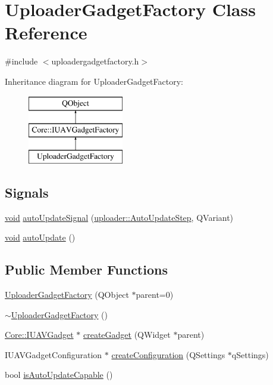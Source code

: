 \hypertarget{class_uploader_gadget_factory}{\section{Uploader\-Gadget\-Factory Class Reference}
\label{class_uploader_gadget_factory}
}


{\ttfamily \#include $<$uploadergadgetfactory.\-h$>$}

Inheritance diagram for Uploader\-Gadget\-Factory\-:\begin{figure}[H]
\begin{center}
\leavevmode
\includegraphics[height=3.000000cm]{class_uploader_gadget_factory}
\end{center}
\end{figure}
\subsection*{Signals}
\begin{DoxyCompactItemize}
\item 
\hyperlink{group___u_a_v_objects_plugin_ga444cf2ff3f0ecbe028adce838d373f5c}{void} \hyperlink{group___y_modem_uploader_ga1db019129aec5db54cea977a3628092e}{auto\-Update\-Signal} (\hyperlink{namespaceuploader_adb90c08cc33a348c2363c1d7a9626422}{uploader\-::\-Auto\-Update\-Step}, Q\-Variant)
\item 
\hyperlink{group___u_a_v_objects_plugin_ga444cf2ff3f0ecbe028adce838d373f5c}{void} \hyperlink{group___y_modem_uploader_gaf1635d4877cd9ffd1933c45884278845}{auto\-Update} ()
\end{DoxyCompactItemize}
\subsection*{Public Member Functions}
\begin{DoxyCompactItemize}
\item 
\hyperlink{group___y_modem_uploader_ga33e544ad20fa638bbf34e7a461d3306e}{Uploader\-Gadget\-Factory} (Q\-Object $\ast$parent=0)
\item 
\hyperlink{group___y_modem_uploader_ga7509287bf0bfbf3b364591ac90155886}{$\sim$\-Uploader\-Gadget\-Factory} ()
\item 
\hyperlink{class_core_1_1_i_u_a_v_gadget}{Core\-::\-I\-U\-A\-V\-Gadget} $\ast$ \hyperlink{group___y_modem_uploader_gaec0b67dc3c2b6c12df29c01be93457fb}{create\-Gadget} (Q\-Widget $\ast$parent)
\item 
I\-U\-A\-V\-Gadget\-Configuration $\ast$ \hyperlink{group___y_modem_uploader_gada950b4297da08d576452a67d7c42f59}{create\-Configuration} (Q\-Settings $\ast$q\-Settings)
\item 
bool \hyperlink{group___y_modem_uploader_ga1c32bfa644ec01ae5f98410b24c7f6fd}{is\-Auto\-Update\-Capable} ()
\end{DoxyCompactItemize}
